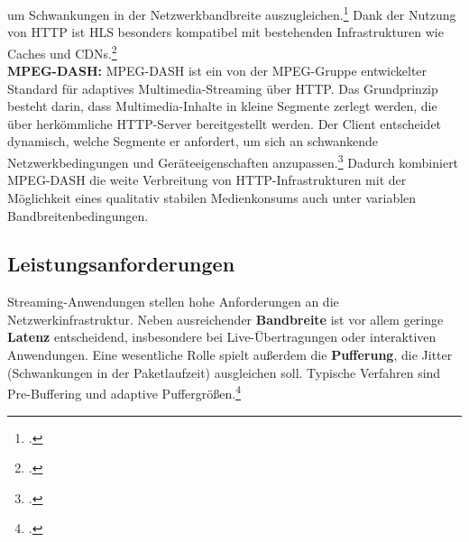 \documentclass[12pt,a4paper]{report}
\begin{document}
  um Schwankungen in der Netzwerkbandbreite auszugleichen.\footcite[Vgl.][siehe HTTP Live Streaming Overview]{rfc8216}
  Dank der Nutzung von \ac{HTTP} ist \ac{HLS} besonders kompatibel mit bestehenden Infrastrukturen wie Caches und \acp{CDN}.\footcite[Vgl.][]{stockhammer2011dash}
  \\
  \newline
  \textbf{MPEG-DASH:}
  \ac{MPEG-DASH} ist ein von der MPEG-Gruppe entwickelter Standard für adaptives Multimedia-Streaming über \ac{HTTP}.
  Das Grundprinzip besteht darin, dass Multimedia-Inhalte in kleine Segmente zerlegt werden, die über herkömmliche \ac{HTTP}-Server bereitgestellt werden.
  Der Client entscheidet dynamisch, welche Segmente er anfordert, um sich an schwankende Netzwerkbedingungen und Geräteeigenschaften anzupassen.\footcite[Vgl.][S.~1~ f.]{stockhammer2011dash}
  Dadurch kombiniert \ac{MPEG-DASH} die weite Verbreitung von \ac{HTTP}-Infrastrukturen mit der Möglichkeit eines qualitativ stabilen Medienkonsums auch unter variablen Bandbreitenbedingungen.
    
  \subsection{Leistungsanforderungen}  
  Streaming-Anwendungen stellen hohe Anforderungen an die Netzwerkinfrastruktur. 
  Neben ausreichender \textbf{Bandbreite} ist vor allem geringe \textbf{Latenz} entscheidend, 
  insbesondere bei Live-Übertragungen oder interaktiven Anwendungen. 
  Eine wesentliche Rolle spielt außerdem die \textbf{Pufferung}, 
  die Jitter (Schwankungen in der Paketlaufzeit) ausgleichen soll. 
  Typische Verfahren sind Pre-Buffering und adaptive Puffergrößen.\footcite[Vgl.][S.~697~ff.]{tanenbaum_computernetworks}  
\end{document}
